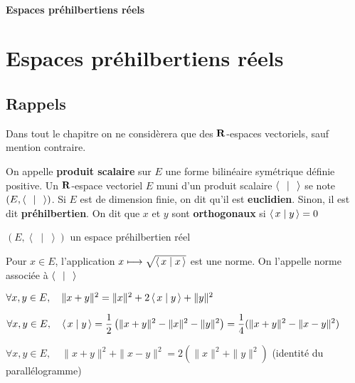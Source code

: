 \ifsolo
    ~

    \vspace{1cm}

    \begin{center}
        \textbf{\LARGE Espaces préhilbertiens réels} \\[1em]
    \end{center}
    \tableofcontents
\else
    \chapter{Espaces préhilbertiens réels}

    \minitoc
\fi
\thispagestyle{empty}

\section{Rappels}

Dans tout le chapitre on ne considèrera que des $ \mathbf R$-espaces vectoriels, sauf mention contraire.

\begin{dfn}
    On appelle \textbf{produit scalaire} sur $E$ une forme bilinéaire symétrique définie positive. Un $ \mathbf R$-espace vectoriel $E$ muni d'un produit scalaire  $ \scalar{\;}{\;} $ se note $(E, \scalar{\;}{\;} )$. Si $E$ est de dimension finie, on dit qu'il est  \textbf{euclidien}. Sinon, il est dit \textbf{préhilbertien}. On dit que $x$ et  $y$ sont  \textbf{orthogonaux} si $ \scalar{x}{y} =0$
\end{dfn}

\begin{defprop}
    \Hyp $(E, \left\langle\; \middle| \; \right\rangle )$ un espace préhilbertien réel

    \begin{concenum}
    \item Pour $x \in E$, l'application $x\longmapsto \sqrt{\scalar{x}{x}} $ est une norme. On l'appelle norme associée à $ \scalar{\;}{\;} $
    \item $\forall  x, y \in  E, \quad  \|x+y\|^2 = \|x\|^2 + 2 \scalar{x}{y} +\|y\|^2$
    \item $\displaystyle\forall  x, y \in  E, \quad  \scalar{x}{y} =\frac{1}{2}\left( \|x+y\|^2 - \|x\|^2 -\|y\|^2 \right) =\frac{1}{4} (\|x+y\|^2 -\|x-y\|^2 )$
    \item $\forall  x, y \in  E, \quad  \|x+y\|^2 +\|x-y\|^2 =2 (\|x\|^2 +\|y\|^2 )$ (identité du parallélogramme)
    \end{concenum}
\end{defprop}

